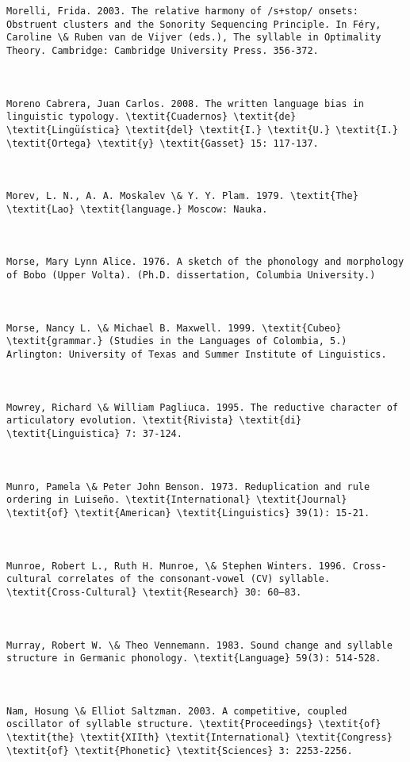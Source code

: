 \begin{verbatim}
Morelli, Frida. 2003. The relative harmony of /s+stop/ onsets: Obstruent clusters and the Sonority Sequencing Principle. In Féry, Caroline \& Ruben van de Vijver (eds.), The syllable in Optimality Theory. Cambridge: Cambridge University Press. 356-372. 



Moreno Cabrera, Juan Carlos. 2008. The written language bias in linguistic typology. \textit{Cuadernos} \textit{de} \textit{Lingüística} \textit{del} \textit{I.} \textit{U.} \textit{I.} \textit{Ortega} \textit{y} \textit{Gasset} 15: 117-137.



Morev, L. N., A. A. Moskalev \& Y. Y. Plam. 1979. \textit{The} \textit{Lao} \textit{language.} Moscow: Nauka.



Morse, Mary Lynn Alice. 1976. A sketch of the phonology and morphology of Bobo (Upper Volta). (Ph.D. dissertation, Columbia University.)



Morse, Nancy L. \& Michael B. Maxwell. 1999. \textit{Cubeo} \textit{grammar.} (Studies in the Languages of Colombia, 5.) Arlington: University of Texas and Summer Institute of Linguistics.



Mowrey, Richard \& William Pagliuca. 1995. The reductive character of articulatory evolution. \textit{Rivista} \textit{di} \textit{Linguistica} 7: 37-124.



Munro, Pamela \& Peter John Benson. 1973. Reduplication and rule ordering in Luiseño. \textit{International} \textit{Journal} \textit{of} \textit{American} \textit{Linguistics} 39(1): 15-21.



Munroe, Robert L., Ruth H. Munroe, \& Stephen Winters. 1996. Cross-cultural correlates of the consonant-vowel (CV) syllable. \textit{Cross-Cultural} \textit{Research} 30: 60–83.



Murray, Robert W. \& Theo Vennemann. 1983. Sound change and syllable structure in Germanic phonology. \textit{Language} 59(3): 514-528.



Nam, Hosung \& Elliot Saltzman. 2003. A competitive, coupled oscillator of syllable structure. \textit{Proceedings} \textit{of} \textit{the} \textit{XIIth} \textit{International} \textit{Congress} \textit{of} \textit{Phonetic} \textit{Sciences} 3: 2253-2256.




\end{verbatim}
